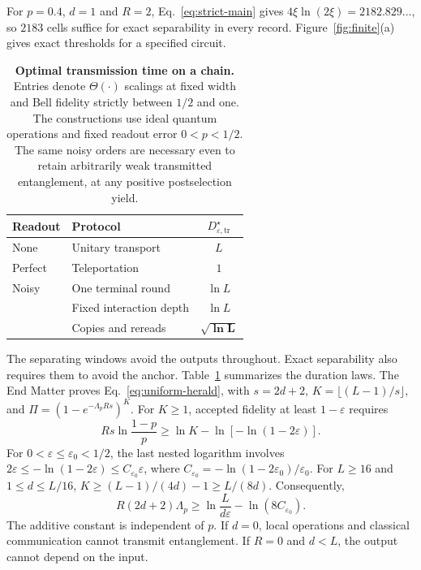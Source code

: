 \documentclass[aps,prl,twocolumn,superscriptaddress,longbibliography,reprint,floatfix]{revtex4-2}
\newcommand{\eps}{\varepsilon}
\newcommand{\Dopt}{D_{\eps,\mathrm{tr}}^{\star}}
\begin{document}
For $p=0.4$, $d=1$ and $R=2$, Eq.~\eqref{eq:strict-main} gives $4\xi\ln(2\xi)=2182.829\ldots$, so $2183$ cells suffice for exact separability in every record. Figure~\ref{fig:finite}(a) gives exact thresholds for a specified circuit.

\begin{table}[tb]
\caption{\textbf{Optimal transmission time on a chain.} Entries denote $\Theta(\cdot)$ scalings at fixed width and Bell fidelity strictly between $1/2$ and one. The constructions use ideal quantum operations and fixed readout error $0<p<1/2$. The same noisy orders are necessary even to retain arbitrarily weak transmitted entanglement, at any positive postselection yield.}
\label{tab:times}
\centering
\renewcommand{\arraystretch}{1.15}
\begin{tabular}{@{}llc@{}}
\toprule
Readout & Protocol & $\Dopt$\\
\midrule
None & Unitary transport & $L$\\
Perfect & Teleportation & $1$\\
\addlinespace[3pt]
Noisy & One terminal round & $\ln L$\\
      & Fixed interaction depth & $\ln L$\\
      & Copies and rereads & $\bm{\sqrt{\ln L}}$\\
\bottomrule
\end{tabular}
\end{table}
The separating windows avoid the outputs throughout. Exact separability
also requires them to avoid the anchor.
Table~\ref{tab:times} summarizes the duration laws. The End Matter proves
Eq.~\eqref{eq:uniform-herald}, with
$s=2d+2$, $K=\lfloor(L-1)/s\rfloor$, and
$\Pi=(1-e^{-\Lambda_p Rs})^K$.
For $K\ge1$, accepted fidelity at least $1-\eps$ requires
\begin{equation}
 Rs\ln\frac{1-p}{p}
 \ge\ln K-\ln[-\ln(1-2\eps)].
 \label{eq:Snecessary}
\end{equation}
For $0<\eps\le\eps_0<1/2$, the last nested logarithm involves
$2\eps\le-\ln(1-2\eps)\le C_{\eps_0}\eps$,
where $C_{\eps_0}=-\ln(1-2\eps_0)/\eps_0$.
For $L\ge16$ and $1\le d\le L/16$,
$K\ge(L-1)/(4d)-1\ge L/(8d)$.
Consequently,
\begin{equation}
 R(2d+2)\Lambda_p
 \ge\ln\frac{L}{d\eps}-\ln(8C_{\eps_0}).
 \label{eq:tradeoff}
\end{equation}
The additive constant is independent of $p$.
If $d=0$, local operations and classical communication cannot transmit
entanglement. If $R=0$ and $d<L$, the output cannot depend on the input.
\end{document}
